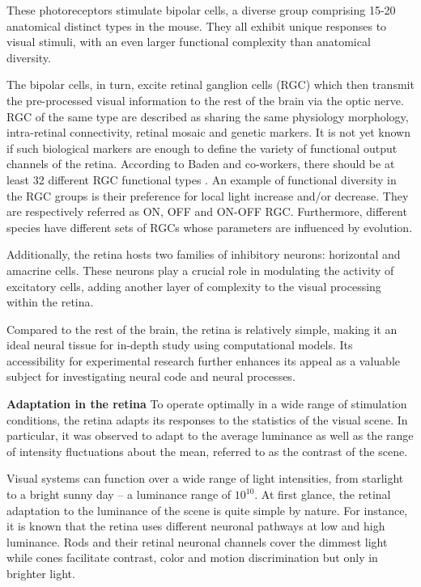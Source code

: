 These photoreceptors stimulate bipolar cells, a diverse group comprising 15-20
anatomical
distinct types in the mouse. They all exhibit unique
responses to visual stimuli, with an even larger functional complexity than
anatomical diversity. %

The bipolar cells, in turn, excite retinal ganglion cells (RGC) which then
transmit the pre-processed visual  information to the rest of the
brain via the optic nerve.
RGC of the same type are described as sharing the same
physiology morphology,
intra-retinal connectivity, retinal mosaic and genetic markers. It is not yet
known if such biological markers are enough to define the variety of functional
output channels of the retina. According to Baden and co-workers, there should
be at least 32 different RGC
functional types \citep{baden_functional_2016}. An example of functional
diversity in the RGC groups is their preference for local light increase and/or
decrease. They are respectively referred as ON, OFF and ON-OFF RGC.
Furthermore, different species have different sets of RGCs whose parameters are
influenced by evolution.

Additionally, the retina hosts two families of inhibitory neurons: horizontal
and
amacrine cells. These neurons play a crucial role in modulating the activity of
excitatory cells, adding another layer of complexity to the visual processing
within the retina.

Compared to the rest of the brain, the retina is relatively simple,
making it an ideal neural tissue for in-depth study using computational models.
Its accessibility for experimental research further enhances its appeal as a
valuable subject for investigating neural code and neural processes.

\textbf{Adaptation in the retina}
To operate optimally in a wide range of
stimulation conditions, the retina adapts its responses to the statistics of
the visual scene.
In particular, it was observed to adapt to the average
luminance as well as the range of intensity fluctuations about the mean,
referred to as the contrast of the scene.

Visual systems can function over a wide range of light intensities, from
starlight to a bright sunny day – a luminance range of $10^{10}$.
At first glance, the retinal adaptation to the luminance of the scene is quite
simple by nature.
For instance, it is known that the retina uses different neuronal
pathways at low and high luminance. Rods and their retinal neuronal channels
cover the dimmest light while cones facilitate contrast, color and motion
discrimination but only in brighter light.

